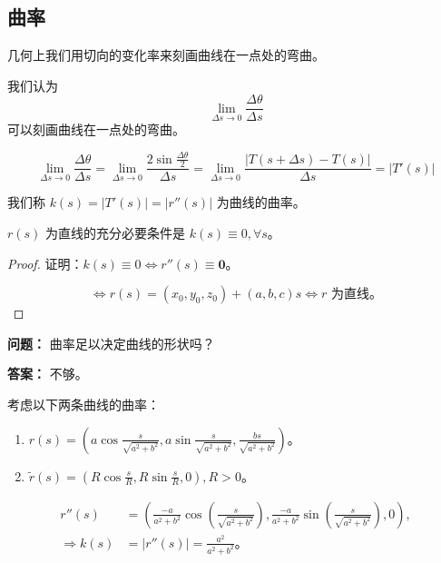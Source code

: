 \documentclass[lang=cn,10pt,thmcnt=section]{elegantbook}
\renewcommand{\vec}[1]{\mathbf{#1}}
\begin{document}
\subsection{曲率}

    几何上我们用切向的变化率来刻画曲线在一点处的弯曲。

    我们认为
    \[
    \lim_{\Delta s \to 0} \frac{\Delta \theta}{\Delta s}
    \]
    可以刻画曲线在一点处的弯曲。

    
\begin{proposition}
    \[
    \lim_{\Delta s \to 0} \frac{\Delta \theta}{\Delta s} = \lim_{\Delta s \to 0} \frac{2 \sin \frac{\Delta \theta}{2}}{\Delta s} = \lim_{\Delta s \to 0} \frac{|T(s + \Delta s) - T(s)|}{\Delta s} = |T'(s)|
    \]
\end{proposition}
\begin{definition}[曲率]
    我们称 $k(s) = |T'(s)| = |r''(s)|$ 为曲线的曲率。
    \end{definition}
    
    \begin{proposition}
    $r(s)$ 为直线的充分必要条件是 $k(s) \equiv 0, \forall s$。
    \end{proposition}
    
    \begin{proof}
    证明：$k(s) \equiv 0 \Leftrightarrow r''(s) \equiv \vec{0}$。
    
    \[
    \Leftrightarrow r(s) = (x_0, y_0, z_0) + (a, b, c)s \Leftrightarrow r \text{ 为直线}。
    \]
    \end{proof}
    
    \textbf{问题：} 曲率足以决定曲线的形状吗？
    
    \textbf{答案：} 不够。
    
    \begin{example}[两条曲线的曲率]
    考虑以下两条曲线的曲率：
    \begin{enumerate}
        \item $r(s) = \left( a \cos \frac{s}{\sqrt{a^2 + b^2}}, a \sin \frac{s}{\sqrt{a^2 + b^2}}, \frac{b s}{\sqrt{a^2 + b^2}} \right)$。
        \item $\tilde{r}(s) = \left( R \cos \frac{s}{R}, R \sin \frac{s}{R}, 0 \right), R > 0$。
    \end{enumerate}
    \end{example}
    
    \begin{align*}
    r''(s) &= \left( \frac{-a}{a^2 + b^2} \cos \left( \frac{s}{\sqrt{a^2 + b^2}} \right), \frac{-a}{a^2 + b^2} \sin \left( \frac{s}{\sqrt{a^2 + b^2}} \right), 0 \right), \\
    \Rightarrow k(s) &= |r''(s)| = \frac{a^2}{a^2 + b^2}。
    \end{align*}
    
\end{document}
